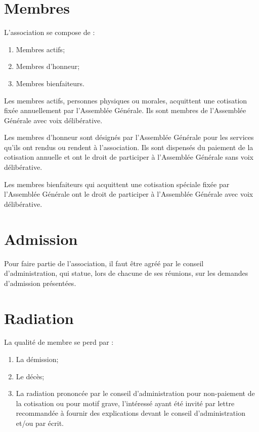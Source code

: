\documentclass[12pt]{constitution}
\begin{document}
	
	\section{Membres}
	L'association se compose de :
	\begin{enumerate}
		\item Membres actifs;
		\item Membres d'honneur;
		\item Membres bienfaiteurs.
	\end{enumerate}
	
	\medskip
	Les membres actifs, personnes physiques ou morales, acquittent une cotisation fixée annuellement par l'Assemblée Générale. Ils sont membres de l'Assemblée Générale avec voix délibérative.
	
	\medskip
	Les membres d'honneur sont désignés par l'Assemblée Générale pour les services qu'ils ont rendus ou rendent à l'association. Ils sont dispensés du paiement de la cotisation annuelle et ont le droit de participer à l'Assemblée Générale sans voix délibérative.
	
	\medskip
	Les membres bienfaiteurs qui acquittent une cotisation spéciale fixée par l'Assemblée Générale ont le droit de participer à l'Assemblée Générale avec voix délibérative.
	
	\section{Admission}
	Pour faire partie de l'association, il faut être agréé par le conseil d’administration, qui statue, lors de chacune de ses réunions, sur les demandes d'admission présentées.
	
	\section{Radiation}
	La qualité de membre se perd par :
	\begin{enumerate}
		\item La démission;
		\item Le décès;
		\item La radiation prononcée par le conseil d'administration pour non-paiement de la cotisation ou pour motif grave, l'intéressé ayant été invité par lettre recommandée à fournir des explications devant le conseil d'administration et/ou par écrit. 
	\end{enumerate}
	
\end{document}
